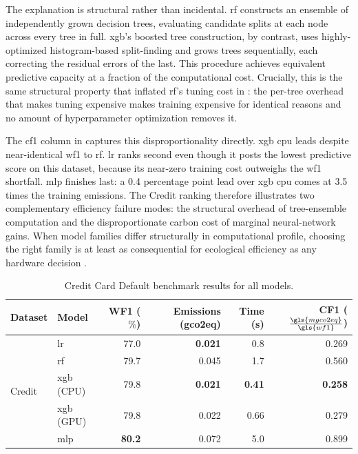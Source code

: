 The explanation is structural rather than incidental. \gls{rf} constructs an ensemble of independently grown decision trees, evaluating candidate splits at each node across every tree in full. \gls{xgb}'s boosted tree construction, by contrast, uses highly-optimized histogram-based split-finding and grows trees sequentially, each correcting the residual errors of the last. This procedure achieves equivalent predictive capacity at a fraction of the computational cost. Crucially, this is the same structural property that inflated \gls{rf}'s tuning cost in : the per-tree overhead that makes tuning expensive makes training expensive for identical reasons and no amount of hyperparameter optimization removes it.

The \gls{cf1} column in  captures this disproportionality directly. \gls{xgb} \gls{cpu} leads despite near-identical \gls{wf1} to \gls{rf}. \Gls{lr} ranks second even though it posts the lowest predictive score on this dataset, because its near-zero training cost outweighs the \gls{wf1} shortfall. \gls{mlp} finishes last: a 0.4 percentage point lead over \gls{xgb} \gls{cpu} comes at 3.5 times the training emissions. The Credit ranking therefore illustrates two complementary efficiency failure modes: the structural overhead of tree-ensemble computation and the disproportionate carbon cost of marginal neural-network gains. When model families differ structurally in computational profile, choosing the right family is at least as consequential for ecological efficiency as any hardware decision \parencite{verdecchiaDataCentricGreenAI2022a}.

\begin{table}[htbp]
\centering
\caption{Credit Card Default benchmark results for all models.}
\label{tab:credit_results}
\begin{tabular}{@{} l l r r r r @{}}
\toprule
Dataset & Model & WF1 ($\%$) & Emissions (\gls{gco2eq}) & Time (s) & CF1 ($\frac{\gls{mgco2eq}}{\gls{wf1}}$) \\
\midrule
\multirow{5}{*}{Credit}
  & \gls{lr}          & 77.0          & \textbf{0.021} &          0.8  & 0.269 \\
  & \gls{rf}          & 79.7          &          0.045 &          1.7  & 0.560 \\
  & \gls{xgb} (CPU)   & 79.8          & \textbf{0.021} & \textbf{0.41} & \textbf{0.258} \\
  & \gls{xgb} (GPU)   & 79.8          &          0.022 &          0.66 & 0.279 \\
  & \gls{mlp}         & \textbf{80.2} &          0.072 &          5.0  & 0.899 \\
\bottomrule
\end{tabular}
\end{table}


